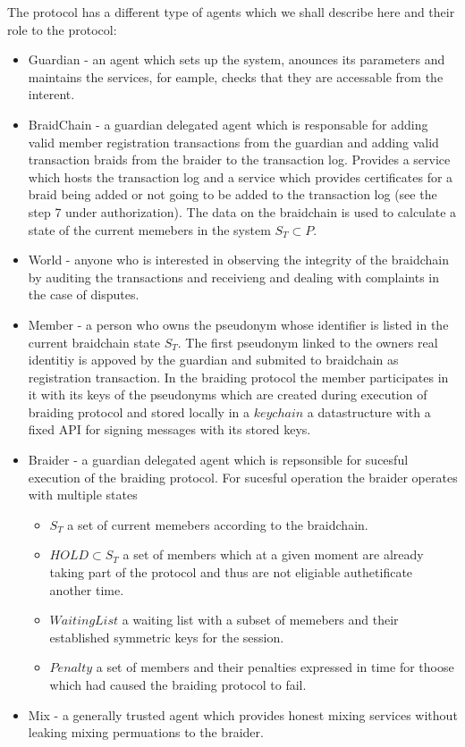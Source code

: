 \documentclass[12pt]{article}
\begin{document}
The protocol has a different type of agents which we shall describe here and their role to the protocol:
\begin{itemize}
\item Guardian - an agent which sets up the system, anounces its parameters and maintains the services, for eample, checks that they are accessable from the interent. 
\item BraidChain - a guardian delegated agent which is responsable for adding valid member registration transactions from the guardian and adding valid transaction braids from the braider to the transaction log. Provides a service which hosts the transaction log and a service which provides certificates for a braid being added or not going to be added to the transaction log (see the step 7 under authorization). The data on the braidchain is used to calculate a state of the current memebers in the system $S_T \subset P$. 
\item World - anyone who is interested in observing the integrity of the braidchain by auditing the transactions and receivieng and dealing with complaints in the case of disputes.
\item Member - a person who owns the pseudonym whose identifier is listed in the current braidchain state $S_T$. The first pseudonym linked to the owners real identitiy is appoved by the guardian and submited to braidchain as registration transaction. In the braiding protocol the member participates in it with its keys of the pseudonyms which are created during execution of braiding protocol and stored locally in a $keychain$ a datastructure with a fixed API for signing messages with its stored keys. 
\item Braider - a guardian delegated agent which is repsonsible for sucesful execution of the braiding protocol. For sucesful operation the braider operates with multiple states
  \begin{itemize}
  \item $S_T$ a set of current memebers according to the braidchain.
  \item $HOLD \subset S_T$ a set of members which at a given moment are already taking part of the protocol and thus are not eligiable authetificate another time.
  \item $WaitingList$ a waiting list with a subset of memebers and their established symmetric keys for the session. 
  \item $Penalty$ a set of members and their penalties expressed in time for thoose which had caused the braiding protocol to fail.
  \end{itemize}
\item Mix - a generally trusted agent which provides honest mixing services without leaking mixing permuations to the braider. 
\end{itemize}
\end{document}
